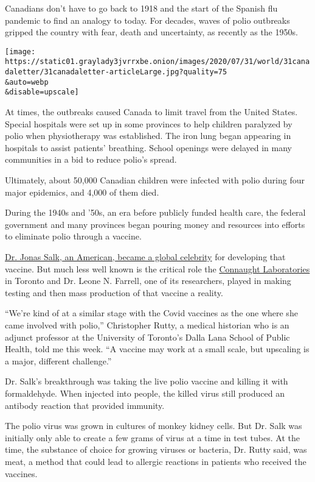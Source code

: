 Canadians don't have to go back to 1918 and the start of the Spanish flu
pandemic to find an analogy to today. For decades, waves of polio
outbreaks gripped the country with fear, death and uncertainty, as
recently as the 1950s.

\texttt{[image: https://static01.graylady3jvrrxbe.onion/images/2020/07/31/world/31canadaletter/31canadaletter-articleLarge.jpg?quality=75\\\&auto=webp\\\&disable=upscale]}

At times, the outbreaks caused Canada to limit travel from the United
States. Special hospitals were set up in some provinces to help children
paralyzed by polio when physiotherapy was established. The iron lung
began appearing in hospitals to assist patients' breathing. School
openings were delayed in many communities in a bid to reduce polio's
spread.

Ultimately, about 50,000 Canadian children were infected with polio
during four major epidemics, and 4,000 of them died.

During the 1940s and '50s, an era before publicly funded health care,
the federal government and many provinces began pouring money and
resources into efforts to eliminate polio through a vaccine.

\href{https://www.sciencehistory.org/historical-profile/jonas-salk-and-albert-bruce-sabin}{Dr.
Jonas Salk, an American, became a global celebrity} for developing that
vaccine. But much less well known is the critical role the
\href{https://connaught.research.utoronto.ca/history/}{Connaught
Laboratories} in Toronto and Dr. Leone N. Farrell, one of its
researchers, played in making testing and then mass production of that
vaccine a reality.

``We're kind of at a similar stage with the Covid vaccines as the one
where she came involved with polio,'' Christopher Rutty, a medical
historian who is an adjunct professor at the University of Toronto's
Dalla Lana School of Public Health, told me this week. ``A vaccine may
work at a small scale, but upscaling is a major, different challenge.''

Dr. Salk's breakthrough was taking the live polio vaccine and killing it
with formaldehyde. When injected into people, the killed virus still
produced an antibody reaction that provided immunity.

The polio virus was grown in cultures of monkey kidney cells. But Dr.
Salk was initially only able to create a few grams of virus at a time in
test tubes. At the time, the substance of choice for growing viruses or
bacteria, Dr. Rutty said, was meat, a method that could lead to allergic
reactions in patients who received the vaccines.


